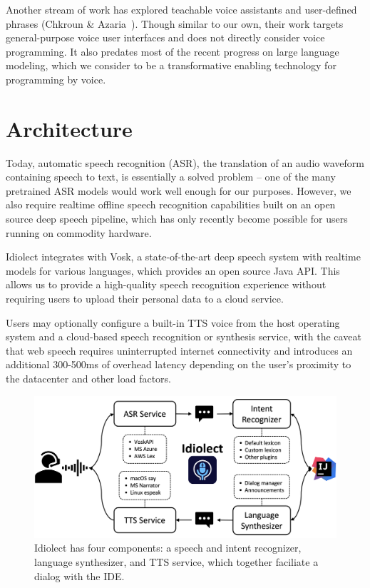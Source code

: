 \documentclass[conference]{IEEEtran}
\begin{document}
Another stream of work has explored teachable voice assistants and user-defined phrases (Chkroun \& Azaria~\cite{chkroun2019lia}). Though similar to our own, their work targets general-purpose voice user interfaces and does not directly consider voice programming. It also predates most of the recent progress on large language modeling, which we consider to be a transformative enabling technology for programming by voice.

\section{Architecture}

Today, automatic speech recognition (ASR), the translation of an audio waveform containing speech to text, is essentially a solved problem -- one of the many pretrained ASR models would work well enough for our purposes. However, we also require realtime offline speech recognition capabilities built on an open source deep speech pipeline, which has only recently become possible for users running on commodity hardware.

Idiolect integrates with Vosk, a state-of-the-art deep speech system with realtime models for various languages, which provides an open source Java API. This allows us to provide a high-quality speech recognition experience without requiring users to upload their personal data to a cloud service.



Users may optionally configure a built-in TTS voice from the host operating system and a cloud-based speech recognition or synthesis service, with the caveat that web speech requires uninterrupted internet connectivity and introduces an additional 300-500ms of overhead latency depending on the user's proximity to the datacenter and other load factors.

\begin{figure}[t]
    \centering
    \includegraphics[width=0.9\linewidth]{architecture.png}
    \caption{Idiolect has four components: a speech and intent recognizer, language synthesizer, and TTS service, which together faciliate a dialog with the IDE.}
    \label{fig:architectural_overview}
\end{figure}
\end{document}
